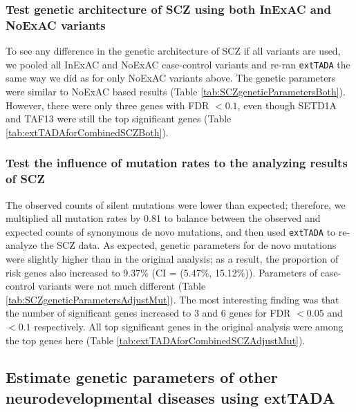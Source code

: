 \documentclass[]{article}
\begin{document}
\subsubsection{Test genetic architecture of SCZ using both InExAC and
  NoExAC variants}

To see any difference in the genetic architecture of SCZ if all variants
are used, we pooled all InExAC and NoExAC case-control variants and
re-ran \texttt{extTADA} the same way we did as for only NoExAC variants
above. The genetic parameters were similar to NoExAC based results
(Table \ref{tab:SCZgeneticParametersBoth}). However, there were only
three genes with FDR $< 0.1$, even though SETD1A and TAF13 were
still the top significant genes (Table \ref{tab:extTADAforCombinedSCZBoth}).

\subsubsection{Test the influence of mutation rates to the analyzing
  results of SCZ}

The observed counts of silent mutations were lower than expected; therefore,
we multiplied all mutation rates by 0.81 to balance between the observed
and expected counts of synonymous de novo mutations, and then used
\texttt{extTADA} to re-analyze the SCZ data. As expected, genetic parameters
for de novo mutations were slightly higher than in the original analysis;
as a result, the proportion of risk genes also increased to 9.37$\%$
(CI = (5.47$\%$, 15.12$\%$)). Parameters of case-control variants were
not much different (Table
\ref{tab:SCZgeneticParametersAdjustMut}). The most interesting finding was
that the number of significant genes increased to 3 and 6 genes for
FDR $<0.05$ and $<0.1$ respectively. All top significant genes in the
original analysis were among the top genes here (Table \ref{tab:extTADAforCombinedSCZAdjustMut}).


\subsection{Estimate genetic parameters of other neurodevelopmental diseases using extTADA}
\end{document}
